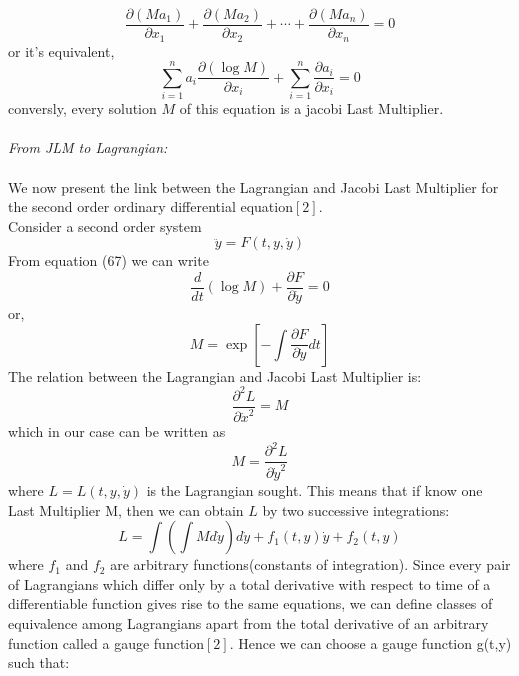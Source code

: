 \documentclass[14pt]{extarticle}
\begin{document}
\begin{equation}
\frac{\partial\left(M a_{1}\right)}{\partial x_{1}}+\frac{\partial\left(M a_{2}\right)}{\partial x_{2}}+\cdots+\frac{\partial\left(M a_{n}\right)}{\partial x_{n}}=0
\end{equation} 
or it's equivalent, \\
\begin{equation}
\sum_{i=1}^{n} a_{i} \frac{\partial(\log M)}{\partial x_{i}}+\sum_{i=1}^{n} \frac{\partial a_{i}}{\partial x_{i}}=0
\end{equation}
conversly, every solution $M$ of this equation is a jacobi Last Multiplier.\\ \\
\textit{From JLM to Lagrangian:}\\ \\
We now present the link between the Lagrangian and Jacobi Last Multiplier for the second order ordinary differential equation$[2]$.\\ 
Consider a second order system\\
\begin{equation}
\ddot{y}=F(t, y, \dot{y})
\end{equation} 
From equation (67) we can write \\
\begin{equation}
\frac{d}{d t}(\log M)+\frac{\partial F}{\partial \dot{y}}=0
\end{equation}
or,\\
\begin{equation}
M=\exp \left[-\int \frac{\partial F}{\partial \dot{y}} d t\right]
\end{equation}
The relation between the Lagrangian and Jacobi Last Multiplier is:\\
\begin{equation}
\frac{\partial^{2} L}{\partial \dot{x}^{2}}=M
\end{equation}
which in our case can be written as \\
\begin{equation}
M=\frac{\partial^{2} L}{\partial \dot{y}^{2}}
\end{equation}
where $L=L(t,y,\dot{y})$ is the Lagrangian sought. This means that if know one Last Multiplier M, then we can obtain $L$ by two successive integrations:\\
\begin{equation}
L=\int\left(\int M d \dot{y}\right) d \dot{y}+f_{1}(t, y) \dot{y}+f_{2}(t, y)
\end{equation}
where $f_{1}$ and $f_{2}$ are arbitrary functions(constants of integration). Since every pair of Lagrangians which differ only by a total derivative with respect to time of a differentiable function gives rise to the same equations, we can define classes of equivalence among Lagrangians apart from the total derivative of an arbitrary function called a gauge function$[2]$. Hence we can choose a gauge function g(t,y) such that:\\
\end{document}
